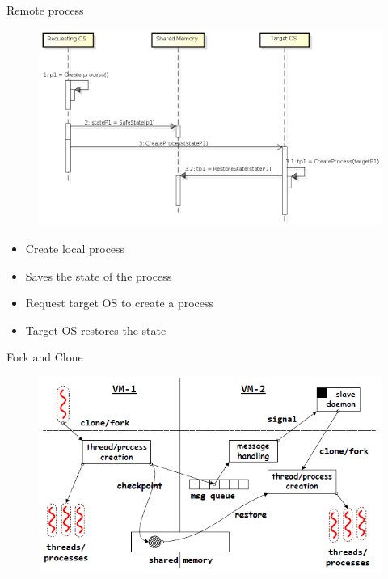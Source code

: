 \documentclass{beamer}
\begin{document}
	\begin{frame}{Remote process}

	\begin{figure} [H]
			\centering
			\includegraphics[scale=0.3]{img/cerberus-process-creation}
	\end{figure}

	\begin{itemize}[<+->]
	\item Create local process
	\item Saves the state of the process
	\item Request target OS to create a process
	\item Target OS restores the state
	\end{itemize}
	
	\end{frame}	
	
	\begin{frame}{Fork and Clone}
	
		\begin{figure} [H]
			\centering
			\includegraphics[scale=0.40]{img/cerberus-fork-clone}
		\end{figure}	
	
	\end{frame}	
	
\end{document}
